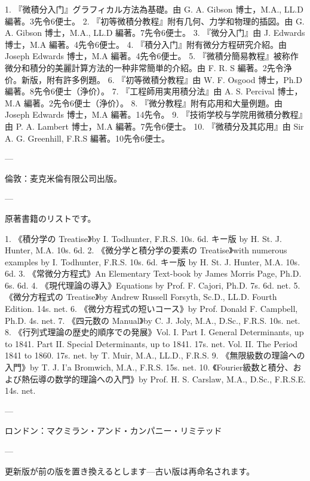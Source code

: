 \documentclass[a4paper,11pt,openany]{ltjsbook}
\begin{document}
\begin{enumerate}
1. 『微積分入门』グラフィカル方法為基礎。由 G. A. Gibson 博士，M.A., LL.D 編著。3先令6便士。
2. 『初等微積分教程』附有几何、力学和物理的插図。由 G. A. Gibson 博士，M.A., LL.D 編著。7先令6便士。
3. 『微分入门』由 J. Edwards 博士，M.A 編著。4先令6便士。
4. 『積分入门』附有微分方程研究介紹。由 Joseph Edwards 博士，M.A 編著。4先令6便士。
5. 『微積分簡易教程』被称作微分和積分的美麗計算方法的一种非常簡単的介紹。由 F. R. S 編著。2先令浄价。新版，附有許多例題。
6. 『初等微積分教程』由 W. F. Osgood 博士，Ph.D 編著。8先令6便士（浄价）。
7. 『工程師用実用積分法』由 A. S. Percival 博士，M.A 編著。2先令6便士（浄价）。
8. 『微分教程』附有応用和大量例題。由 Joseph Edwards 博士，M.A 編著。14先令。
9. 『技術学校与学院用微積分教程』由 P. A. Lambert 博士，M.A 編著。7先令6便士。
10. 『微積分及其応用』由 Sir A. G. Greenhill, F.R.S 編著。10先令6便士。

---

倫敦：麦克米倫有限公司出版。

---

原著書籍のリストです。

1. 《積分学の Treatise》by I. Todhunter, F.R.S. 10s. 6d. キー版 by H. St. J. Hunter, M.A. 10s. 6d.
2. 《微分学と積分学の要素の Treatise》with numerous examples by I. Todhunter, F.R.S. 10s. 6d. キー版 by H. St. J. Hunter, M.A. 10s. 6d.
3. 《常微分方程式》An Elementary Text-book by James Morris Page, Ph.D. 6s. 6d.
4. 《現代理論の導入》Equations by Prof. F. Cajori, Ph.D. 7s. 6d. net.
5. 《微分方程式の Treatise》by Andrew Russell Forsyth, Sc.D., LL.D. Fourth Edition. 14s. net.
6. 《微分方程式の短いコース》by Prof. Donald F. Campbell, Ph.D. 4s. net.
7. 《四元数の Manual》by C. J. Joly, M.A., D.Sc., F.R.S. 10s. net.
8. 《行列式理論の歴史的順序での発展》Vol. I. Part I. General Determinants, up to 1841. Part II. Special Determinants, up to 1841. 17s. net. Vol. II. The Period 1841 to 1860. 17s. net. by T. Muir, M.A., LL.D., F.R.S.
9. 《無限級数の理論への入門》by T. J. I'a Bromwich, M.A., F.R.S. 15s. net.
10. 《Fourier級数と積分、および熱伝導の数学的理論への入門》by Prof. H. S. Carslaw, M.A., D.Sc., F.R.S.E. 14s. net.

---

ロンドン：マクミラン・アンド・カンパニー・リミテッド

---

更新版が前の版を置き換えるとします—古い版は再命名されます。

\end{enumerate}




\backmatter
\end{document}
